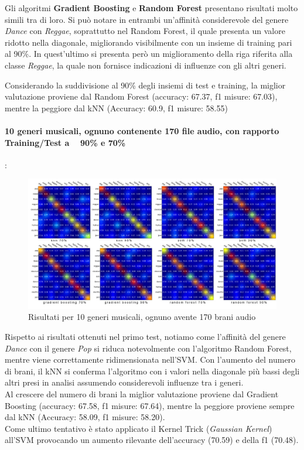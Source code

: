 \documentclass[%
 reprint,
 amsmath,amssymb,
 aps,
 article,
]{revtex4-1}
\begin{document}
Gli algoritmi \textbf{Gradient Boosting} e \textbf{Random Forest} presentano risultati molto simili tra di loro. Si può notare in entrambi un'affinità considerevole del genere \textit{Dance} con \textit{Reggae}, soprattutto nel Random Forest, il quale presenta un valore ridotto nella diagonale, migliorando visibilmente con un insieme di training pari al 90\%. In quest'ultimo si presenta però un miglioramento della riga riferita alla classe \textit{Reggae}, la quale non fornisce indicazioni di influenze con gli altri generi.

Considerando la suddivisione al 90\% degli insiemi di test e training, la miglior valutazione proviene dal Random Forest (accuracy: 67.37, f1 misure: 67.03), mentre la peggiore dal kNN (Accuracy: 60.9, f1 misure: 58.55)
\\
\paragraph{10 generi musicali, ognuno contenente 170 file audio, con rapporto Training/Test a ~ 90\% e 70\%}:

\begin{figure} [h!]
  \includegraphics[width=\linewidth]{images/Results-170tracksPerGenre-10genres.jpg}
  \caption{Risultati per 10 generi musicali, ognuno avente 170 brani audio}
  \label{fig:r_10_170}
\end{figure}

Rispetto ai risultati ottenuti nel primo test, notiamo come l'affinità del genere \textit{Dance} con il genere \textit{Pop} si riduca notevolmente con l'algoritmo Random Forest, mentre viene correttamente ridimensionata nell'SVM. Con l'aumento del numero di brani, il kNN si conferma l'algoritmo con i valori nella diagonale più bassi degli altri presi in analisi assumendo considerevoli influenze tra i generi.\\
Al crescere del numero di brani la miglior valutazione proviene dal Gradient Boosting (accuracy: 67.58, f1 misure: 67.64), mentre la peggiore proviene sempre dal kNN (Accuracy: 58.09, f1 misure: 58.20).\\
Come ultimo tentativo è stato applicato il Kernel Trick (\textit{Gaussian Kernel}) all'SVM provocando un aumento rilevante dell'accuracy (70.59) e della f1 (70.48). 
\end{document}
